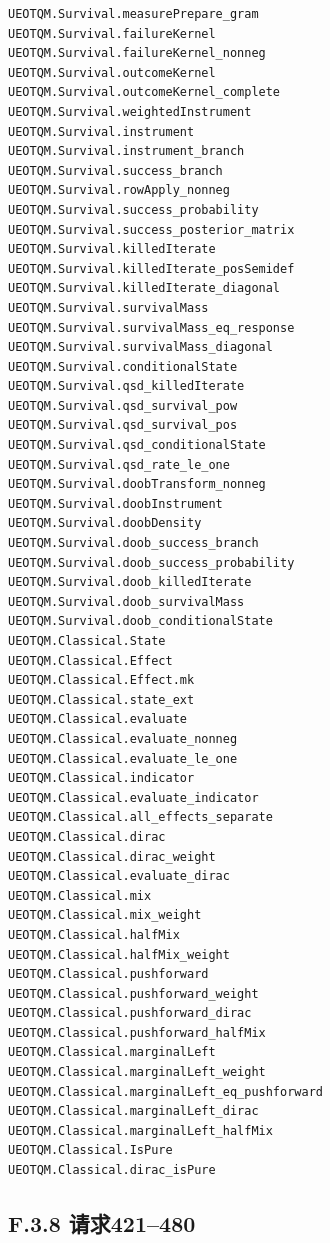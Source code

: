 \documentclass[
  11pt,
  oneside]{book}
\begin{document}
\begin{Verbatim}[breaklines,breakanywhere,fontsize=\scriptsize]
UEOTQM.Survival.measurePrepare_gram
UEOTQM.Survival.failureKernel
UEOTQM.Survival.failureKernel_nonneg
UEOTQM.Survival.outcomeKernel
UEOTQM.Survival.outcomeKernel_complete
UEOTQM.Survival.weightedInstrument
UEOTQM.Survival.instrument
UEOTQM.Survival.instrument_branch
UEOTQM.Survival.success_branch
UEOTQM.Survival.rowApply_nonneg
UEOTQM.Survival.success_probability
UEOTQM.Survival.success_posterior_matrix
UEOTQM.Survival.killedIterate
UEOTQM.Survival.killedIterate_posSemidef
UEOTQM.Survival.killedIterate_diagonal
UEOTQM.Survival.survivalMass
UEOTQM.Survival.survivalMass_eq_response
UEOTQM.Survival.survivalMass_diagonal
UEOTQM.Survival.conditionalState
UEOTQM.Survival.qsd_killedIterate
UEOTQM.Survival.qsd_survival_pow
UEOTQM.Survival.qsd_survival_pos
UEOTQM.Survival.qsd_conditionalState
UEOTQM.Survival.qsd_rate_le_one
UEOTQM.Survival.doobTransform_nonneg
UEOTQM.Survival.doobInstrument
UEOTQM.Survival.doobDensity
UEOTQM.Survival.doob_success_branch
UEOTQM.Survival.doob_success_probability
UEOTQM.Survival.doob_killedIterate
UEOTQM.Survival.doob_survivalMass
UEOTQM.Survival.doob_conditionalState
UEOTQM.Classical.State
UEOTQM.Classical.Effect
UEOTQM.Classical.Effect.mk
UEOTQM.Classical.state_ext
UEOTQM.Classical.evaluate
UEOTQM.Classical.evaluate_nonneg
UEOTQM.Classical.evaluate_le_one
UEOTQM.Classical.indicator
UEOTQM.Classical.evaluate_indicator
UEOTQM.Classical.all_effects_separate
UEOTQM.Classical.dirac
UEOTQM.Classical.dirac_weight
UEOTQM.Classical.evaluate_dirac
UEOTQM.Classical.mix
UEOTQM.Classical.mix_weight
UEOTQM.Classical.halfMix
UEOTQM.Classical.halfMix_weight
UEOTQM.Classical.pushforward
UEOTQM.Classical.pushforward_weight
UEOTQM.Classical.pushforward_dirac
UEOTQM.Classical.pushforward_halfMix
UEOTQM.Classical.marginalLeft
UEOTQM.Classical.marginalLeft_weight
UEOTQM.Classical.marginalLeft_eq_pushforward
UEOTQM.Classical.marginalLeft_dirac
UEOTQM.Classical.marginalLeft_halfMix
UEOTQM.Classical.IsPure
UEOTQM.Classical.dirac_isPure
\end{Verbatim}

\hypertarget{f.3.8-ux8bf7ux6c42421480}{%
\subsection{F.3.8 请求421--480}\label{f.3.8-ux8bf7ux6c42421480}}
\end{document}
